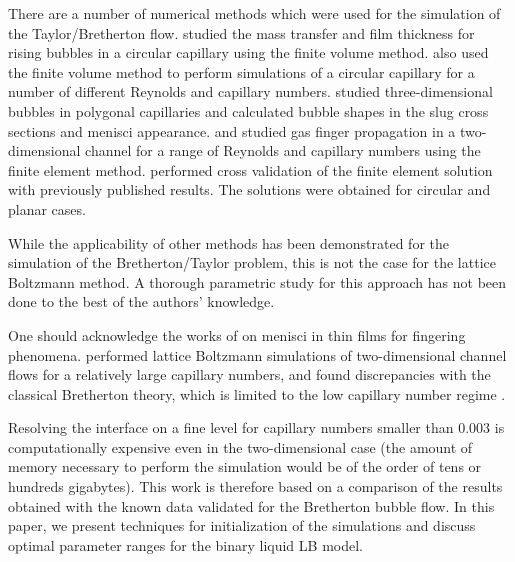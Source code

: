 \documentclass[preprint,12pt]{elsarticle}
\begin{document}
There are a number of numerical methods which
were used for the simulation of the Taylor/Bretherton flow.
\citet{vanbaten-circular} studied the mass transfer and film
thickness for rising bubbles in a circular capillary using the finite volume method.
\citet{kreutzer-pressure-drop} also used the finite volume method to perform
simulations of a circular capillary for a number of different
Reynolds and capillary numbers. \citeauthor{wong-films} \cite{wong-films,wong-pressure} studied
three-dimensional bubbles in
polygonal capillaries and calculated bubble shapes in the
slug cross sections and menisci appearance.
\citet{heil-bretherton} and \citet{ingham-plates} studied gas finger propagation in
a two-dimensional channel for a range of Reynolds and capillary
numbers using the finite element method. \citet{giavedoni-numerical} performed cross validation of the
finite element solution with previously published results.
The solutions were obtained for circular and planar cases.

While the applicability of other methods has been demonstrated for the
simulation of the Bretherton/Taylor problem, this is not the case for
the lattice Boltzmann method. A thorough parametric study for this approach
has not been done to the best of the authors' knowledge.

One should acknowledge the works of \citet{pagonabarraga-fingers} on menisci
in thin films for fingering phenomena. \citet{sehgal-microchannel} performed lattice Boltzmann
simulations of two-dimensional channel flows for a relatively large capillary numbers, and
found discrepancies with the classical Bretherton theory, which
is limited to the low capillary number regime \cite{giavedoni-numerical}.

Resolving the interface on a fine level for capillary numbers smaller than
$0.003$ is computationally expensive even in the two-dimensional case
(the amount of memory necessary to perform the simulation would be of the order
of tens or hundreds gigabytes).  This work is therefore based on a
comparison of the results obtained with the known data
validated for the Bretherton bubble flow.  In this paper, we present
techniques for initialization of the simulations and discuss optimal
parameter ranges for the binary liquid LB model.
\end{document}

